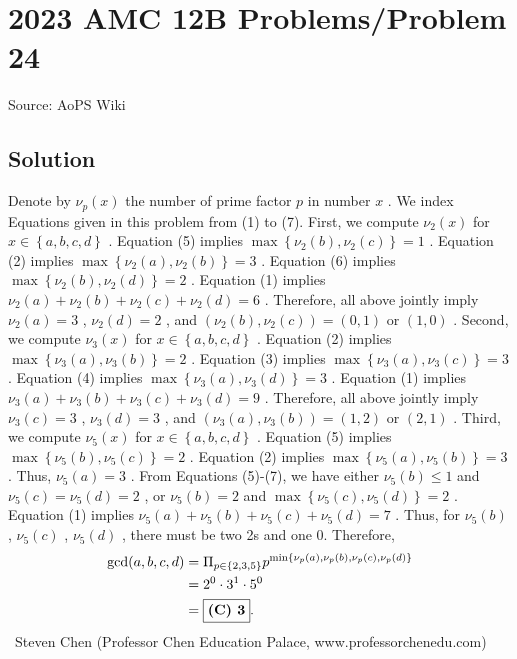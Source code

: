 \documentclass[12pt]{article}
\begin{document}
\section*{{2023 AMC 12B Problems/Problem 24}}
Source: AoPS Wiki

\subsection*{Solution}
Denote by $\nu_p (x)$ the number of prime factor $p$ in number $x$ . We index Equations given in this problem from (1) to (7). First, we compute $\nu_2 (x)$ for $x \in \left\{ a, b, c, d \right\}$ . Equation (5) implies $\max \left\{ \nu_2 (b), \nu_2 (c) \right\} = 1$ .
Equation (2) implies $\max \left\{ \nu_2 (a), \nu_2 (b) \right\} = 3$ .
Equation (6) implies $\max \left\{ \nu_2 (b), \nu_2 (d) \right\} = 2$ .
Equation (1) implies $\nu_2 (a) + \nu_2 (b) + \nu_2 (c) + \nu_2 (d) = 6$ . Therefore, all above jointly imply $\nu_2 (a) = 3$ , $\nu_2 (d) = 2$ , and $\left( \nu_2 (b), \nu_2 (c) \right) = \left( 0 , 1 \right)$ or $\left( 1, 0 \right)$ . Second, we compute $\nu_3 (x)$ for $x \in \left\{ a, b, c, d \right\}$ . Equation (2) implies $\max \left\{ \nu_3 (a), \nu_3 (b) \right\} = 2$ .
Equation (3) implies $\max \left\{ \nu_3 (a), \nu_3 (c) \right\} = 3$ .
Equation (4) implies $\max \left\{ \nu_3 (a), \nu_3 (d) \right\} = 3$ .
Equation (1) implies $\nu_3 (a) + \nu_3 (b) + \nu_3 (c) + \nu_3 (d) = 9$ . Therefore, all above jointly imply $\nu_3 (c) = 3$ , $\nu_3 (d) = 3$ , and $\left( \nu_3 (a), \nu_3 (b) \right) = \left( 1 , 2 \right)$ or $\left( 2, 1 \right)$ . Third, we compute $\nu_5 (x)$ for $x \in \left\{ a, b, c, d \right\}$ . Equation (5) implies $\max \left\{ \nu_5 (b), \nu_5 (c) \right\} = 2$ .
Equation (2) implies $\max \left\{ \nu_5 (a), \nu_5 (b) \right\} = 3$ .
Thus, $\nu_5 (a) = 3$ . From Equations (5)-(7), we have either $\nu_5 (b) \leq 1$ and $\nu_5 (c) = \nu_5 (d) = 2$ , or $\nu_5 (b) = 2$ and $\max \left\{ \nu_5 (c), \nu_5 (d) \right\} = 2$ . Equation (1) implies $\nu_5 (a) + \nu_5 (b) + \nu_5 (c) + \nu_5 (d) = 7$ .
Thus, for $\nu_5 (b)$ , $\nu_5 (c)$ , $\nu_5 (d)$ , there must be two 2s and one 0. Therefore, \begin{align*} {\rm gcd} (a,b,c,d) & = \Pi_{p \in \{ 2, 3, 5\}} p^{\min\{ \nu_p (a), \nu_p(b) , \nu_p (c), \nu_p(d) \}} \\ & = 2^0 \cdot 3^1 \cdot 5^0 \\ & = \boxed{\textbf{(C) 3}}. \end{align*} ~Steven Chen (Professor Chen Education Palace, www.professorchenedu.com)
\end{document}
